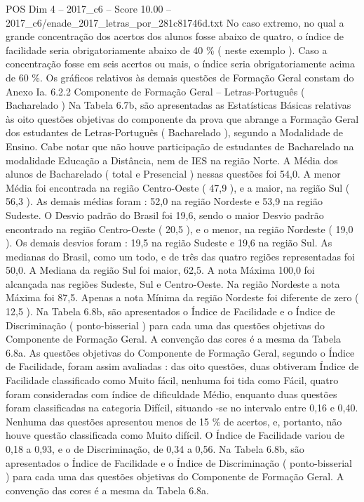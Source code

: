 \begin{textsample}{POS Dim 4 – 2017\_c6 – Score 10.00 – 2017\_c6/enade\_2017\_letras\_por\_281c81746d.txt}
No caso extremo, no qual a grande concentração dos acertos dos alunos fosse abaixo de quatro, o índice de facilidade seria obrigatoriamente abaixo de 40 \% ( neste exemplo ).
Caso a concentração fosse em seis acertos ou mais, o índice seria obrigatoriamente acima de 60 \%.
Os gráficos relativos às demais questões de Formação Geral constam do Anexo Ia. 6.2.2 Componente de Formação Geral – Letras-Português ( Bacharelado ) Na Tabela 6.7b, são apresentadas as Estatísticas Básicas relativas às oito questões objetivas do componente da prova que abrange a Formação Geral dos estudantes de Letras-Português ( Bacharelado ), segundo a Modalidade de Ensino.
Cabe notar que não houve participação de estudantes de Bacharelado na modalidade Educação a Distância, nem de IES na região Norte.
A Média dos alunos de Bacharelado ( total e Presencial ) nessas questões foi 54,0.
A menor Média foi encontrada na região Centro-Oeste ( 47,9 ), e a maior, na região Sul ( 56,3 ).
As demais médias foram : 52,0 na região Nordeste e 53,9 na região Sudeste.
O Desvio padrão do Brasil foi 19,6, sendo o maior Desvio padrão encontrado na região Centro-Oeste ( 20,5 ), e o menor, na região Nordeste ( 19,0 ).
Os demais desvios foram : 19,5 na região Sudeste e 19,6 na região Sul.
As medianas do Brasil, como um todo, e de três das quatro regiões representadas foi 50,0.
A Mediana da região Sul foi maior, 62,5.
A nota Máxima 100,0 foi alcançada nas regiões Sudeste, Sul e Centro-Oeste.
Na região Nordeste a nota Máxima foi 87,5.
Apenas a nota Mínima da região Nordeste foi diferente de zero ( 12,5 ).
Na Tabela 6.8b, são apresentados o Índice de Facilidade e o Índice de Discriminação ( ponto-bisserial ) para cada uma das questões objetivas do Componente de Formação Geral.
A convenção das cores é a mesma da Tabela 6.8a.
As questões objetivas do Componente de Formação Geral, segundo o Índice de Facilidade, foram assim avaliadas : das oito questões, duas obtiveram Índice de Facilidade classificado como Muito fácil, nenhuma foi tida como Fácil, quatro foram consideradas com índice de dificuldade Médio, enquanto duas questões foram classificadas na categoria Difícil, situando -se no intervalo entre 0,16 e 0,40.
Nenhuma das questões apresentou menos de 15 \% de acertos, e, portanto, não houve questão classificada como Muito difícil.
O Índice de Facilidade variou de 0,18 a 0,93, e o de Discriminação, de 0,34 a 0,56.
Na Tabela 6.8b, são apresentados o Índice de Facilidade e o Índice de Discriminação ( ponto-bisserial ) para cada uma das questões objetivas do Componente de Formação Geral.
A convenção das cores é a mesma da Tabela 6.8a.

\end{textsample}

